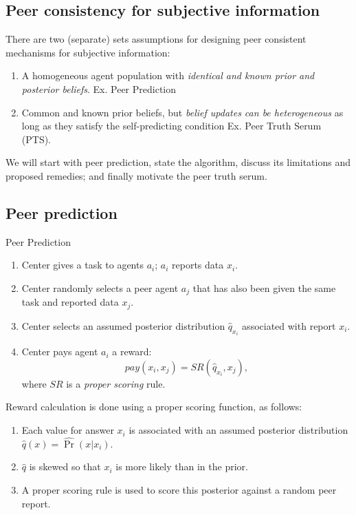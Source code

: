 \documentclass{report}
\theoremstyle{definition}
\begin{document}
\subsection{Peer consistency for subjective information}
There are two (separate) sets assumptions for designing peer consistent mechanisms for subjective information:
\begin{enumerate}
    \item A homogeneous agent population with \emph{identical and known prior and posterior beliefs}. Ex. Peer Prediction
    
    \item Common and known prior beliefs, but \emph{belief updates can be heterogeneous} as long as they satisfy the self-predicting condition
    Ex. Peer Truth Serum (PTS).
\end{enumerate}

We will start with peer prediction, state the algorithm, discuss its limitations and proposed remedies; and finally motivate the peer truth serum.


\subsection{Peer prediction}
\begin{algorithm}[H]
    \caption{Peer Prediction}
    \label{alg:peer_prediction}
    \begin{enumerate}
        \item Center gives a task to agents $a_i$; $a_i$ reports data $x_i$.
        \item Center randomly selects a peer agent $a_j$ that has also been given the same task and reported data $x_j$.
        
        \item Center selects an assumed posterior distribution $\hat{q}_{x_i}$ associated with report $x_i$.
        
        \item{Center pays agent $a_i$ a reward:
        \begin{equation*}
            pay(x_i, x_j)= SR(\hat{q}_{x_i}, x_j),
        \end{equation*}}
        where $SR$ is a \emph{proper scoring} rule.
    \end{enumerate}
\end{algorithm}

Reward calculation is done using a proper scoring function, as follows:

\begin{enumerate}
   \item Each value for answer $x_i$ is associated with an assumed posterior distribution $\hat{q}(x) = \hat{\Pr}(x|x_i)$.

 \item $\hat{q}$ is skewed so that $x_i$ is more likely than in the prior.

 \item A proper scoring rule is used to score this posterior against a random peer report.
\end{enumerate}
\end{document}

